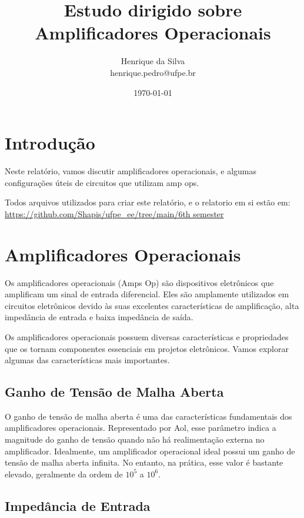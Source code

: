 \documentclass[12pt,twoside, a4paper, twocolumn]{article}
\title{Estudo dirigido sobre Amplificadores Operacionais}
\author{Henrique da Silva \\ henrique.pedro@ufpe.br}
\date{\today}
\begin{document}
\maketitle
{}
\newpage
\tableofcontents
\newpage

\section{Introdução}


Neste relatório, vamos discutir amplificadores operacionais, e algumas configurações úteis de circuitos que utilizam amp ops.


Todos arquivos utilizados para criar este relatório, e o relatorio em si estão em:  \url{https://github.com/Shapis/ufpe_ee/tree/main/6th semester}


\section{Amplificadores Operacionais}


Os amplificadores operacionais (Amps Op) são dispositivos eletrônicos que amplificam um sinal de entrada diferencial. Eles são amplamente utilizados em circuitos eletrônicos devido às suas excelentes características de amplificação, alta impedância de entrada e baixa impedância de saída.


Os amplificadores operacionais possuem diversas características e propriedades que os tornam componentes essenciais em projetos eletrônicos. Vamos explorar algumas das características mais importantes.


\subsection{Ganho de Tensão de Malha Aberta}


O ganho de tensão de malha aberta é uma das características fundamentais dos amplificadores operacionais. Representado por Aol, esse parâmetro indica a magnitude do ganho de tensão quando não há realimentação externa no amplificador. Idealmente, um amplificador operacional ideal possui um ganho de tensão de malha aberta infinita. No entanto, na prática, esse valor é bastante elevado, geralmente da ordem de $10^5$ a $10^6$.


\subsection{Impedância de Entrada}
\end{document}
